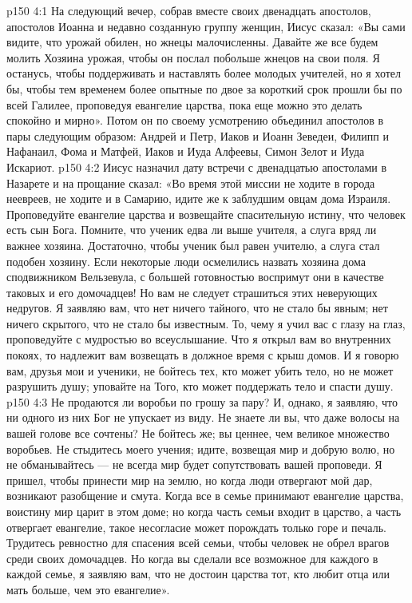 \vs p150 4:1 На следующий вечер, собрав вместе своих двенадцать апостолов, апостолов Иоанна и недавно созданную группу женщин, Иисус сказал: «Вы сами видите, что урожай обилен, но жнецы малочисленны. Давайте же все будем молить Хозяина урожая, чтобы он послал побольше жнецов на свои поля. Я останусь, чтобы поддерживать и наставлять более молодых учителей, но я хотел бы, чтобы тем временем более опытные по двое за короткий срок прошли бы по всей Галилее, проповедуя евангелие царства, пока еще можно это делать спокойно и мирно». Потом он по своему усмотрению объединил апостолов в пары следующим образом: Андрей и Петр, Иаков и Иоанн Зеведеи, Филипп и Нафанаил, Фома и Матфей, Иаков и Иуда Алфеевы, Симон Зелот и Иуда Искариот.
\vs p150 4:2 Иисус назначил дату встречи с двенадцатью апостолами в Назарете и на прощание сказал: «Во время этой миссии не ходите в города неевреев, не ходите и в Самарию, идите же к заблудшим овцам дома Израиля. Проповедуйте евангелие царства и возвещайте спасительную истину, что человек есть сын Бога. Помните, что ученик едва ли выше учителя, а слуга вряд ли важнее хозяина. Достаточно, чтобы ученик был равен учителю, а слуга стал подобен хозяину. Если некоторые люди осмелились назвать хозяина дома сподвижником Вельзевула, с большей готовностью воспримут они в качестве таковых и его домочадцев! Но вам не следует страшиться этих неверующих недругов. Я заявляю вам, что нет ничего тайного, что не стало бы явным; нет ничего скрытого, что не стало бы известным. То, чему я учил вас с глазу на глаз, проповедуйте с мудростью во всеуслышание. Что я открыл вам во внутренних покоях, то надлежит вам возвещать в должное время с крыш домов. И я говорю вам, друзья мои и ученики, не бойтесь тех, кто может убить тело, но не может разрушить душу; уповайте на Того, кто может поддержать тело и спасти душу.
\vs p150 4:3 Не продаются ли воробьи по грошу за пару? И, однако, я заявляю, что ни одного из них Бог не упускает из виду. Не знаете ли вы, что даже волосы на вашей голове все сочтены? Не бойтесь же; вы ценнее, чем великое множество воробьев. Не стыдитесь моего учения; идите, возвещая мир и добрую волю, но не обманывайтесь --- не всегда мир будет сопутствовать вашей проповеди. Я пришел, чтобы принести мир на землю, но когда люди отвергают мой дар, возникают разобщение и смута. Когда все в семье принимают евангелие царства, воистину мир царит в этом доме; но когда часть семьи входит в царство, а часть отвергает евангелие, такое несогласие может порождать только горе и печаль. Трудитесь ревностно для спасения всей семьи, чтобы человек не обрел врагов среди своих домочадцев. Но когда вы сделали все возможное для каждого в каждой семье, я заявляю вам, что не достоин царства тот, кто любит отца или мать больше, чем это евангелие».

